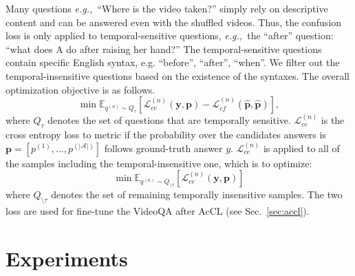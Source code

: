 \documentclass[sigconf]{acmart}
\newcommand{\eg}{\emph{e.g.,~}}
\begin{document}
Many questions \eg ``Where is the video taken?'' simply rely on descriptive content and can be answered even with the shuffled videos. 
Thus, the confusion loss is only applied to temporal-sensitive questions, \eg the ``after'' question: ``what does A do after raising her hand?''
The temporal-sensitive questions contain specific English syntax, e.g. “before”, “after”, “when”. We filter out the temporal-insensitive questions based on the existence of the syntaxes.
The overall optimization objective is as follows.
\begin{equation}
    \min \mathbb{E}_{q^{(n)}\sim Q_{\tau}}\left[\mathcal{L}^{(n)}_{ce}(\mathbf{y},\mathbf{p}) - \mathcal{L}^{(n)}_{cf}(\hat{\mathbf{p}},\hat{\mathbf{p}})\right],
\end{equation}
where $Q_{\tau}$ denotes the set of questions that are temporally sensitive.  $\mathcal{L}^{(n)}_{ce}$ is the cross entropy loss to metric if the probability over the candidates answers is $\mathbf{p}=[p^{(1)}, ..., p^{(|\mathcal{A}|)}]$ follows ground-truth answer $y$.
$\mathcal{L}^{(n)}_{ce}$ is applied to all of the samples including the temporal-insensitive one, which is to optimize:
\begin{equation}
    \min \mathbb{E}_{q^{(n)}\sim Q_{\setminus{{\tau}}}}\left[\mathcal{L}^{(n)}_{ce}(\mathbf{y},\mathbf{p})\right]
\end{equation}
where $Q_{\setminus{{\tau}}}$ denotes the set of remaining temporally insensitive samples.
The two loss are used for fine-tune the VideoQA after AcCL (see Sec.~\ref{sec:accl}).



 \section{Experiments}
\end{document}
